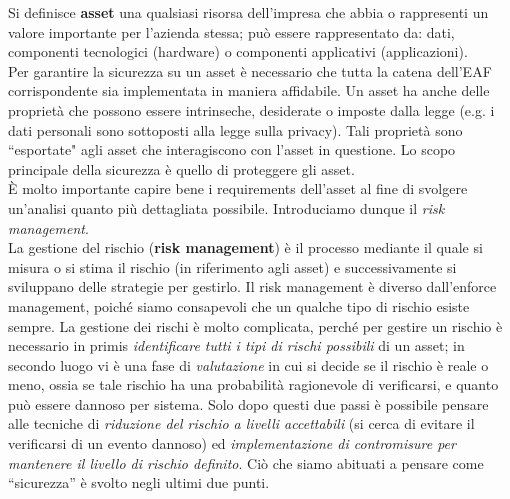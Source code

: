 Si definisce \textbf{asset} una qualsiasi risorsa dell'impresa che abbia o rappresenti un valore importante per l'azienda stessa; può essere rappresentato da: dati, componenti tecnologici (hardware) o componenti applicativi (applicazioni).\\
Per garantire la sicurezza su un asset è necessario che tutta la catena dell'EAF corrispondente sia implementata in maniera affidabile. Un asset ha anche delle proprietà che possono essere intrinseche, desiderate o imposte dalla legge (e.g. i dati personali sono sottoposti alla legge sulla privacy). Tali proprietà sono \textquotedblleft esportate" agli asset che interagiscono con l'asset in questione. Lo scopo principale della sicurezza è quello di proteggere gli asset.\\
È molto importante capire bene i requirements dell'asset al fine di svolgere un'analisi quanto più dettagliata possibile. Introduciamo dunque il \textit{risk management}.\\
La gestione del rischio (\textbf{risk management}) è il processo mediante il quale si misura o si stima il rischio (in riferimento agli asset) e successivamente si sviluppano delle strategie per gestirlo. Il risk management è diverso dall'enforce management, poiché siamo consapevoli che un qualche tipo di rischio esiste sempre. La gestione dei rischi è molto complicata, perché per gestire un rischio è necessario in primis \textit{identificare tutti i tipi di rischi possibili} di un asset; in secondo luogo vi è una fase di \textit{valutazione} in cui si decide se il rischio è reale o meno, ossia se tale rischio ha una probabilità ragionevole di verificarsi, e quanto può essere dannoso per sistema. Solo dopo questi due passi è possibile pensare alle tecniche di \textit{riduzione del rischio a livelli accettabili} (si cerca di evitare il verificarsi di un evento dannoso) ed \textit{implementazione di contromisure per mantenere il livello di rischio definito}. Ciò che siamo abituati a pensare come “sicurezza” è svolto negli ultimi due punti.

